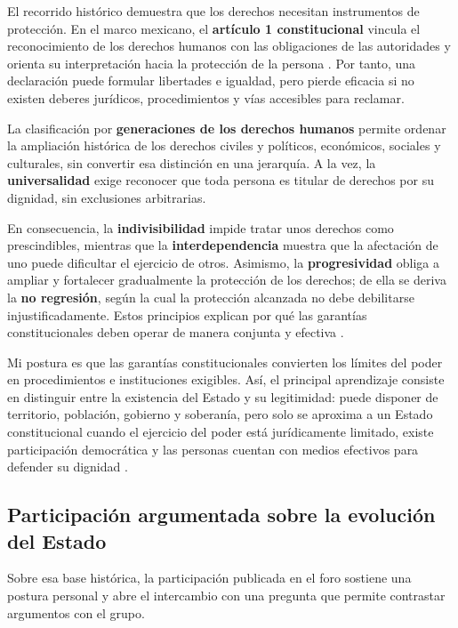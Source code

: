 \documentclass[
  spanish,
  letterpaper, oneside
]{article}
\begin{document}
El recorrido histórico demuestra que los derechos necesitan instrumentos de protección. En el marco mexicano, el \textbf{artículo 1 constitucional} vincula el reconocimiento de los derechos humanos con las obligaciones de las autoridades y orienta su interpretación hacia la protección de la persona \citep{alvarezIcazaDerechosMexico}. Por tanto, una declaración puede formular libertades e igualdad, pero pierde eficacia si no existen deberes jurídicos, procedimientos y vías accesibles para reclamar.

La clasificación por \textbf{generaciones de los derechos humanos} permite ordenar la ampliación histórica de los derechos civiles y políticos, económicos, sociales y culturales, sin convertir esa distinción en una jerarquía. A la vez, la \textbf{universalidad} exige reconocer que toda persona es titular de derechos por su dignidad, sin exclusiones arbitrarias.

En consecuencia, la \textbf{indivisibilidad} impide tratar unos derechos como prescindibles, mientras que la \textbf{interdependencia} muestra que la afectación de uno puede dificultar el ejercicio de otros. Asimismo, la \textbf{progresividad} obliga a ampliar y fortalecer gradualmente la protección de los derechos; de ella se deriva la \textbf{no regresión}, según la cual la protección alcanzada no debe debilitarse injustificadamente. Estos principios explican por qué las garantías constitucionales deben operar de manera conjunta y efectiva \citep{marcanoSalazarDerechosHumanos}.

Mi postura es que las garantías constitucionales convierten los límites del poder en procedimientos e instituciones exigibles. Así, el principal aprendizaje consiste en distinguir entre la existencia del Estado y su legitimidad: puede disponer de territorio, población, gobierno y soberanía, pero solo se aproxima a un Estado constitucional cuando el ejercicio del poder está jurídicamente limitado, existe participación democrática y las personas cuentan con medios efectivos para defender su dignidad \citep{alvarezIcazaDerechosMexico}.

\subsection{Participación argumentada sobre la evolución del Estado}

Sobre esa base histórica, la participación publicada en el foro sostiene una postura personal y abre el intercambio con una pregunta que permite contrastar argumentos con el grupo.
\end{document}
